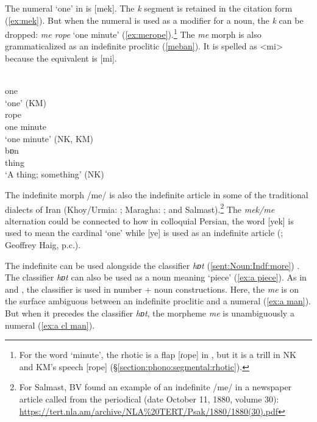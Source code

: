 The numeral `one' in {\iaIA} is [{mek}]. The \textit{{k}} segment is retained in the citation form (\ref{ex:mek}). But when the numeral is used as a modifier for a noun, the \textit{{k}} can be  dropped: \textit{{me rope}} `one minute' (\ref{ex:merope}).\footnote{For the word `minute', the rhotic is a flap [ɾope] in {\seaSEA}, but it is a trill in NK and KM's speech [rope] (\S\ref{section:phono:segmental:rhotic}).} The \textit{{me}} morph is also grammaticalized as an indefinite proclitic (\ref{meban}). It is spelled as  <{mi}> because the {\seaSE} equivalent is [{mi}]. 


\begin{exe}
	\ex 
	\begin{xlist}
		
		\ex {}
		\\
		one
		\\
		\trans	`one' \hfill (KM)\label{ex:mek}
		\\
		\ex {} rope 
		\\
		one minute
		\\
		\trans	`one minute' \hfill (NK, KM)\label{ex:merope}
		\\
		\ex {} bɒn
		\\
		{\indf} thing
		\\
		\trans	`A thing; something' \hfill (NK)\label{meban}
		\\
	\end{xlist}
\end{exe}

The indefinite morph /me/  is also the indefinite article in some of the traditional dialects of Iran (Khoy/Urmia: \citealt[84]{Asatryan-1962-KhoyUrmiaDialect}; Maragha: \citealt[1.78]{Adjarian-1926-MaraghaDialect}; and Salmast).\footnote{For Salmast, BV found an example of an indefinite /me/ in a newspaper article called   from the periodical  (date  October 11, 1880, volume 30): \url{https://tert.nla.am/archive/NLA\%20TERT/Psak/1880/1880(30).pdf}} The \textit{mek/me} alternation could be connected to how in colloquial Persian, the word [yek] is used to mean the cardinal `one' while [ye] is used as an indefinite article   (\citealt[328]{Mahootian-2002-PersianGrammar}; Geoffrey Haig, p.c.).


The indefinite can be used alongside the classifier \textit{{hɒt}} (\ref{sent:Noun:Indf:more}) \citep{sigler-2003-noteClassifierWesternArmenianHad,BaleKhanjian-2009-ClassifiersNumbeerMarking,Sag-2019-SemanticsNumberMarkingReferenceKindsCountingOptionalClassifiers}. The classifier \textit{{hɒt}} can also be used as a noun meaning `piece' (\ref{ex:a piece}). As in {\seaSE} and {\swaWA}, the classifier is used in number + noun constructions. Here, the \textit{{me}} is on the surface ambiguous between an indefinite proclitic and  a numeral (\ref{ex:a man}). But when it precedes the classifier \textit{{hɒt}}, the morpheme \textit{{me}} is unambiguously a numeral (\ref{ex:a cl man}).\largerpage[2]

